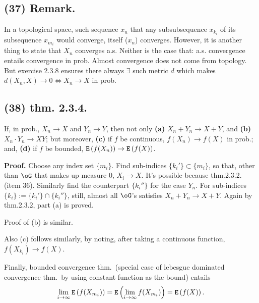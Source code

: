 \documentclass[12pt]{article}
\newcommand{\oo}\infty%
\newcommand{\M}\cdot%
\newcommand{\Ex}\exists%
\newcommand{\Eq}{\Leftrightarrow}%
\newcommand{\Rb}[1]{ \left( #1 \right) }%
\newcommand{\Ss}[1]{\textsf{\bfseries{#1}}}%
\newcommand{\Tw}[1]{\texttt{\bfseries{#1}}}%
\newcommand{\EqGo}[1]{ \begin{gather*}{#1}\end{gather*} } %
\newcommand{\E}[1]{ \Tw{E}\Rb{#1} }%
\begin{document}
\subsection*{(37) Remark.} In a topological space, such sequence \(x_n\) that any subsubsequence \(x_{k_i}\) of its subsequence \(x_{m_i}\) would converge, itself (\(x_n\)) converges. 
However, it is another thing to state that \(X_n\) converges a.s. 
Neither is the case that: a.s. convergence entails convergence in prob. 
Almost convergence does not come from topology. 
But exercise 2.3.8 ensures there always \(\Ex\) such metric \(d\) which makes \(d(X_n, X) \to 0 \Eq X_n \to X\) in prob. 

\subsection*{(38) thm. 2.3.4.} If, in prob., \(X_n \to X\) and \(Y_n \to Y\), 
then not only \Ss{(a)} \(X_n + Y_n \to X+Y\), and \Ss{(b)} \(X_n \M Y_n \to XY\); 
but moreover, \Ss{(c)} if \(f\) be continuous, \(f(X_n) \to f(X)\) in prob.; 
and, \Ss{(d)} if \(f\) be bounded, \(\E{f(X_n)} \to \E{f(X)}\). \par
\Ss{Proof.} Choose any index set \(\{m_i\}\). 
Find sub-indices \(\{k_i'\} \subset \{m_i\}\), so that, other than \(\oG\) that makes up measure 0, \(X_i \to X\). 
It's possible because thm.2.3.2. (item 36).  
Similarly find the counterpart \(\{k_i''\}\) for the case \(Y_n\). 
For sub-indices \(\{k_i\} := \{k_i'\} \cap \{k_i''\}\), still, almost all \(\oG\)'s satisfies \(X_n+Y_n \to X+Y\). 
Again by thm.2.3.2, part (a) is proved. \par
Proof of (b) is similar. \par
Also (c) follows similarly, by noting, after taking a continuous function, \(f(X_{k_i}) \to f(X)\). \par
Finally, bounded convergence thm.\ (special case of lebesgue dominated convergence thm.\ by using constant function as the bound) entails \EqGo{
 \lim_{i \to \oo} \E{f(X_{m_i})} 
 = \E{ \lim_{i \to \oo} f(X_{m_i})}
 = \E{f(X)}.
} 
\end{document}
